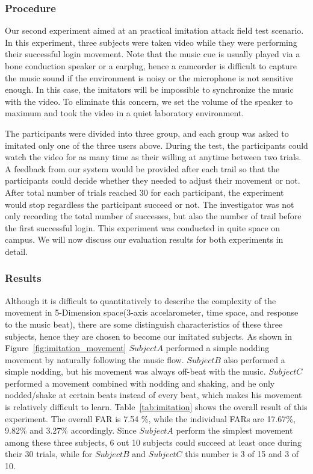 \subsubsection{Procedure}
Our second experiment aimed at an practical imitation attack field test scenario. In this experiment, three subjects were taken video while they were performing their successful login movement. Note that the music cue is usually played via a bone conduction speaker or a earplug, hence a camcorder is difficult to capture the music sound if the environment is noisy or the microphone is not sensitive enough. In this case, the imitators will be impossible to synchronize the music with the video. To eliminate this concern, we set the volume of the speaker to maximum and took the video in a quiet laboratory environment.

The participants were divided into three group, and each group was asked to imitated only one of the three users above. During the test, the participants could watch the video for as many time as their willing at anytime between two trials. A feedback from our system would be provided after each trail so that the participants could decide whether they needed to adjust their movement or not. After total number of trials reached 30 for each participant, the experiment would stop regardless the participant succeed or not. The investigator was not only recording the total number of successes, but also the number of trail before the first successful login. This experiment was conducted in quite space on campus. We will now discuss our evaluation results for both experiments in detail.

\subsubsection{Results}
Although it is difficult to quantitatively to describe the complexity of the movement in 5-Dimension space(3-axis accelarometer, time space,  and response to the music beat), there are some distinguish characteristics of these three subjects, hence they are chosen to become our imitated subjects. As shown in Figure~\ref{fig:imitation_movement} $Subject A$ performed a simple nodding movement by naturally following the music flow. $Subject B$ also performed a simple nodding, but his movement was always off-beat with the music. $Subject C$ performed a movement combined with nodding and shaking, and he only nodded/shake at certain beats instead of every beat, which makes his movement is relatively difficult to learn. Table~\ref{tab:imitation} shows the overall result of this experiment. The overall FAR is 7.54 \%, while the individual FARs are 17.67\%, 9.82\% and 3.27\% accordingly.  Since $Subject A$ perform the simplest movement among these three subjects, 6 out 10 subjects could succeed at least once during their 30 trials, while for $Subject B$ and $Subject C$ this number is 3 of 15 and 3 of 10.

